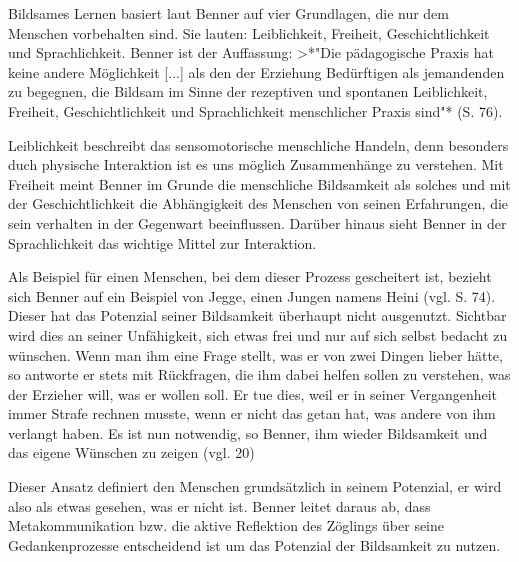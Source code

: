 Bildsames Lernen basiert laut Benner auf vier Grundlagen, die nur dem Menschen  vorbehalten sind.
Sie lauten: Leiblichkeit, Freiheit, Geschichtlichkeit und Sprachlichkeit.
Benner ist der Auffassung:
>*"Die pädagogische Praxis hat keine andere Möglichkeit [...] als den der Erziehung Bedürftigen als jemandenden zu begegnen, die Bildsam im Sinne der rezeptiven und spontanen Leiblichkeit, Freiheit, Geschichtlichkeit und Sprachlichkeit menschlicher Praxis sind"* (S. 76).

Leiblichkeit beschreibt das sensomotorische menschliche Handeln, denn besonders duch physische Interaktion ist es uns möglich Zusammenhänge zu verstehen.
Mit Freiheit meint Benner im Grunde die menschliche Bildsamkeit als solches und mit der Geschichtlichkeit die Abhängigkeit des Menschen von seinen Erfahrungen, die sein verhalten in der Gegenwart beeinflussen.
Darüber hinaus sieht Benner in der Sprachlichkeit das wichtige Mittel zur Interaktion.

Als Beispiel für einen Menschen, bei dem dieser Prozess gescheitert ist, bezieht sich Benner auf ein Beispiel von Jegge, einen Jungen namens Heini (vgl. S. 74).
Dieser hat das Potenzial seiner Bildsamkeit überhaupt nicht ausgenutzt.
Sichtbar wird dies an seiner Unfähigkeit, sich etwas frei und nur auf sich selbst bedacht zu wünschen.
Wenn man ihm eine Frage stellt, was er von zwei Dingen lieber hätte, so antworte er stets mit Rückfragen, die ihm dabei helfen sollen zu verstehen, was der Erzieher will, was er wollen soll.
Er tue dies, weil er in seiner Vergangenheit immer Strafe rechnen musste, wenn er nicht das getan hat, was andere von ihm verlangt haben.
Es ist nun notwendig, so Benner, ihm wieder Bildsamkeit und das eigene Wünschen zu zeigen (vgl. 20)

Dieser Ansatz definiert den Menschen grundsätzlich in seinem Potenzial, er wird also als etwas gesehen, was er nicht ist.
Benner leitet daraus ab, dass Metakommunikation bzw. die aktive Reflektion des Zöglings über seine Gedankenprozesse entscheidend ist um das Potenzial der Bildsamkeit zu nutzen.
